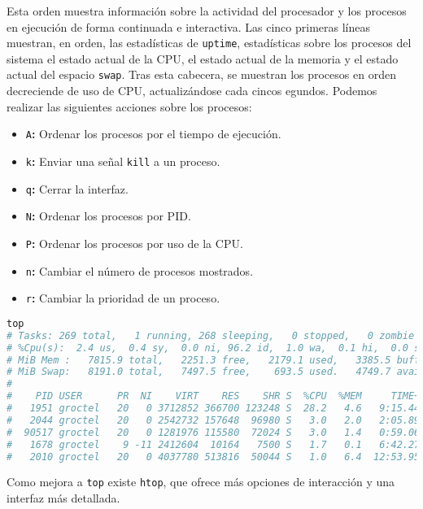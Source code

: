 Esta orden muestra información sobre la actividad del procesador y los procesos en ejecución de forma continuada e interactiva.
Las cinco primeras líneas muestran, en orden, las estadísticas de \texttt{uptime}, estadísticas sobre los procesos del sistema el estado actual de la CPU, el estado actual de la  memoria y el estado actual del espacio \texttt{swap}.
Tras esta cabecera, se muestran los procesos en orden decreciende de uso de CPU, actualizándose cada cincos egundos.
Podemos realizar las siguientes acciones sobre los procesos:

\begin{itemize}
	\item\texttt{A}\textbf{:} Ordenar los procesos por el tiempo de ejecución.
	\item\texttt{k}\textbf{:} Enviar una señal \texttt{kill} a un proceso.
	\item\texttt{q}\textbf{:} Cerrar la interfaz.
	\item\texttt{N}\textbf{:} Ordenar los procesos por PID\@.
	\item\texttt{P}\textbf{:} Ordenar los procesos por uso de la CPU\@.
	\item\texttt{n}\textbf{:} Cambiar el número de procesos mostrados.
	\item\texttt{r}\textbf{:} Cambiar la prioridad de un proceso.
\end{itemize}

\pagebreak

\begin{lstlisting}[language=Bash]
top
# Tasks: 269 total,   1 running, 268 sleeping,   0 stopped,   0 zombie
# %Cpu(s):  2.4 us,  0.4 sy,  0.0 ni, 96.2 id,  1.0 wa,  0.1 hi,  0.0 si,  0.0 st
# MiB Mem :   7815.9 total,   2251.3 free,   2179.1 used,   3385.5 buff/cache
# MiB Swap:   8191.0 total,   7497.5 free,    693.5 used.   4749.7 avail Mem
#
#    PID USER      PR  NI    VIRT    RES    SHR S  %CPU  %MEM     TIME+ COMMAND
#   1951 groctel   20   0 3712852 366700 123248 S  28.2   4.6   9:15.44 firefox
#   2044 groctel   20   0 2542732 157648  96980 S   3.0   2.0   2:05.89 Web Content
#  90517 groctel   20   0 1281976 115580  72024 S   3.0   1.4   0:59.06 mpv
#   1678 groctel    9 -11 2412604  10164   7500 S   1.7   0.1   6:42.27 pulseaudio
#   2010 groctel   20   0 4037780 513816  50044 S   1.0   6.4  12:53.95 telegram-deskto
\end{lstlisting}

Como mejora a \texttt{top} existe \texttt{htop}, que ofrece más opciones de interacción y una interfaz más detallada.

